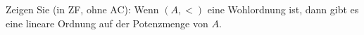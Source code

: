 
\begin{exercise}[287]

Zeigen Sie (in ZF, ohne AC): Wenn $(A,<)$ eine Wohlordnung ist, dann gibt es eine
lineare Ordnung auf der Potenzmenge von $A$.
\end{exercise}


\begin{solution}

\phantom{}

\end{solution}

